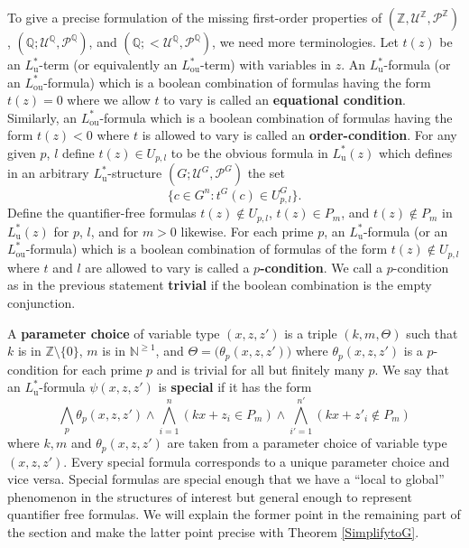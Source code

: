 \documentclass[letterpaper]{amsart}
\newcommand{\qq}{\mathbb{Q}}
\newcommand{\nn}{\mathbb{N}}
\newcommand{\zz}{\mathbb{Z}}
\newcommand{\sU}{\mathscr{U}}
\newcommand{\sP}{\mathscr{P}}
\newcommand{\SF}{\mathrm{SF}^\zz}
\newtheorem{lem}[thm]{Lemma}
\begin{document}
\medskip \noindent To give a precise formulation of the missing first-order properties of $(\zz, \sU^\zz, \sP^\zz)$, $(\qq; \sU^\qq, \sP^\qq)$, and $(\qq; < \sU^\qq, \sP^\qq)$, we need more terminologies. Let $t(z)$ be an $L_\mathrm{u}^*$-term (or equivalently an $L_\mathrm{ou}^*$-term) with variables in $z$.
An $L_\mathrm{u}^*$-formula (or an $L_\mathrm{ou}^*$-formula) which is a  boolean combination of formulas having the form $t(z) =0$ where we allow $t$ to vary is called an {\bf equational condition}. Similarly, an $L_\mathrm{ou}^*$-formula which is a boolean combination of formulas  having the form  $t(z) < 0$ where $t$ is allowed to vary is called an {\bf order-condition}. For any given $p$, $l$ define $t(z) \in U_{p,l}$ to be the obvious formula in $L_\mathrm{u}^*(z)$ which defines in an arbitrary $L_\mathrm{u}^*$-structure $(G; \sU^G, \sP^G)$ the set
$$ \{ c \in G^n : t^G(c) \in U^G_{p,l} \}.  $$
Define  the quantifier-free formulas $t(z) \notin U_{p,l}$, $t(z) \in P_m$,  and $t(z) \notin P_m$ in  $L_\mathrm{u}^*(z)$ for $p$, $l$, and for $m>0$ likewise.
For each prime $p$, an $L_\mathrm{u}^*$-formula (or an $L_\mathrm{ou}^*$-formula) which is a  boolean combination of formulas of the form $t(z) \notin U_{p,l}$ where $t$ and $l$ are allowed to vary is called a {\bf $p$-condition}. We call a $p$-condition as in the previous statement {\bf trivial} if the boolean combination is  the empty conjunction. 


\begin{comment}
\noindent We give an important example of a $p$-condition. Suppose $(G; 1, P)$ is a model of $T^{-}_1$ and $a$ is in $G$. We  write $a \in_p \SF$  if $[a]_{p^2} \neq [0]_{p^2}$ for a given $p$; we can think of such $a$ as square-free locally at $p$. The following observation is immediate:
\begin{lem}
For a given $k \in \zz^m$, there is a $p$-condition $\varphi \in L(x)$ such that 
$$\varphi(a) \ \text{ if and only if}\  k \cdot a \in_p \SF $$
\end{lem}
\end{comment}





\medskip \noindent 
A {\bf parameter choice} of variable type $(x, z, z')$  is a triple $(k,m,\Theta)$ such that $k$ is in $\zz\setminus\{0 \}$, $m$ is in $\nn^{\geq 1}$, and  $\Theta = \big( \theta_p(x,z,z')\big)$ where $\theta_p(x, z, z')$ is a $p$-condition for each prime $p$ and is trivial for all but finitely many $p$.
We say that an $L_\mathrm{u}^*$-formula  $\psi(x, z, z')$ is {\bf special} if it has the form
$$    \bigwedge_{p} \theta_p(x, z, z') \wedge \bigwedge_{i=1}^n (kx+z_i\in P_{m}) \wedge \bigwedge_{i'=1}^{n'} (kx+z'_i \notin P_{m})   $$
where $k, m$ and $\theta_p(x, z, z')$ are taken from a parameter choice of variable type $(x, z, z')$. Every special formula  corresponds to a unique parameter choice and vice versa. Special formulas are   special enough that we have a ``local to global'' phenomenon in the structures of interest  but general enough to represent quantifier free formulas. We will explain the former point in the remaining part of the section and make the latter point precise with Theorem \ref{SimplifytoG}.
\end{document}

